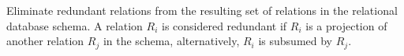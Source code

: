 

Eliminate redundant relations from the resulting set of relations in the relational database schema. A relation $R_i$ is considered redundant if $R_i$ is a projection of another relation $R_j$ in the schema, alternatively, $R_i$ is subsumed by $R_j$. 






